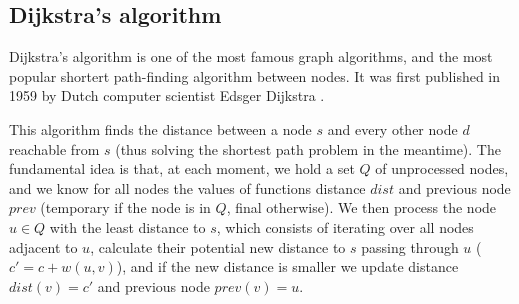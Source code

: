 \documentclass{report}[a4paper]
\theoremstyle{remark}
\begin{document}
\subsection{Dijkstra's algorithm}
Dijkstra's algorithm is one of the most famous graph algorithms, and the most popular shortert path-finding algorithm between nodes. It was first published in 1959 by Dutch computer scientist Edsger Dijkstra \cite{dijkstra}.\par
This algorithm finds the distance between a node $s$ and every other node $d$ reachable from $s$ (thus solving the shortest path problem in the meantime). The fundamental idea is that, at each moment, we hold a set $Q$ of unprocessed nodes, and we know for all nodes the values of functions distance $dist$ and previous node $prev$ (temporary if the node is in $Q$, final otherwise). We then process the node $u \in Q$ with the least distance to $s$, which consists of iterating over all nodes adjacent to $u$, calculate their potential new distance to $s$ passing through $u$ ($c'=c+w(u,v)$), and if the new distance is smaller we update distance $dist(v)=c'$ and previous node $prev(v)=u$.
\end{document}
